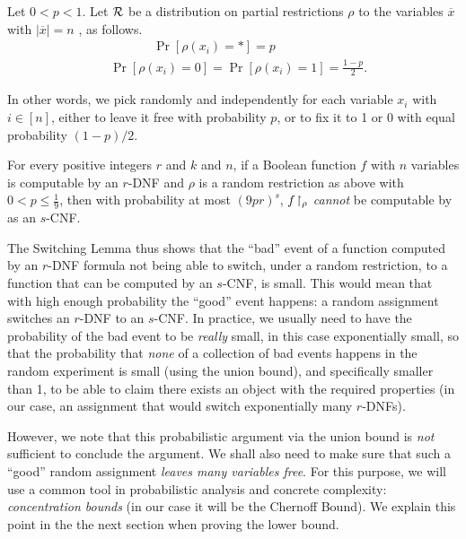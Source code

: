 \begin{tcolorbox}[colframe=white, colback=green!6, boxrule=0mm, sharp corners]
\begin{definition}
 Let $0< p<1$.
Let $\mathcal{R}$ be a distribution on partial restrictions $\rho$ to the variables $\overline{x}$ with $|\overline{x}|=n$ , as follows.
$$
\begin{aligned}
& ~~~~~~~~~~~ \quad \operatorname{Pr}\left[\rho\left(x_i\right)=*\right]=p \\
& \operatorname{Pr}\left[\rho\left(x_i\right)=0\right]=\operatorname{Pr}\left[\rho\left(x_i\right)=1\right]=\frac{1-p}{2}.
\end{aligned}
$$
\end{definition}
\end{tcolorbox}
In other words, we pick randomly and independently for each variable $x_i$ with $i\in[n]$, either to leave it free with probability $p$, or to fix it to 1 or 0 with equal probability $(1-p)/2$.


\begin{tcolorbox}[colframe=white, colback=blue!5, boxrule=0mm, sharp corners]
\begin{theorem}
For every positive integers $r$ and $k$ and $n$, if a Boolean function $f$ with $n$ variables is computable by an $r$-DNF and $\rho$ is a random restriction as above with $0<p \leq \frac{1}{9}$, then with probability at most $(9pr)^s$, $f\!\upharpoonright_\rho$ \emph{cannot} be computable by as an $s$-CNF.
\end{theorem}
\end{tcolorbox}

The Switching Lemma thus shows that the ``bad'' event of a function computed by an $r$-DNF formula not being able to switch, under  a random restriction,  to a function that can be computed by an $s$-CNF, is small. This would mean that with high enough probability the ``good'' event happens: a random assignment switches an $r$-DNF to an $s$-CNF.
In practice, we usually need to have the probability of the bad event to be \emph{really} small, in this case  exponentially small, so that the probability that \emph{none} of a collection of bad events happens in the random experiment is small (using the union bound), and specifically smaller than 1, to be able to claim there exists an object with the required properties (in our case, an assignment that would switch exponentially many $r$-DNFs).  

However, we note that this probabilistic argument via the union bound  is  \emph{not} sufficient to conclude the argument. We shall also need to make sure that such a ``good'' random assignment  \emph{leaves many variables free}. For this purpose, we will use a common tool in probabilistic analysis and concrete complexity: \emph{concentration bounds} (in our case it will be the Chernoff Bound). We  explain this point in the the next section when proving the lower bound.



